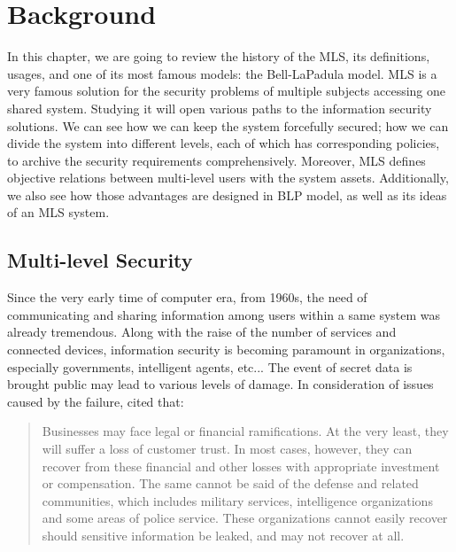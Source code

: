 
\chapter{Background} %

\label{ch:background} %


In this chapter, we are going to review the history of the MLS, its definitions, usages, and one of its most famous models: the Bell-LaPadula model.
MLS is a very famous solution for the security problems of multiple subjects accessing one shared system. 
Studying it will open various paths to the information security solutions.
We can see how we can keep the system forcefully secured; 
how we can divide the system into different levels, each of which has corresponding policies, to archive the security requirements comprehensively.
Moreover, MLS defines objective relations between multi-level users with the system assets. 
Additionally, we also see how those advantages are designed in BLP model, as well as its ideas of an MLS system.


\section{Multi-level Security}
\label{ch:background:mls}

Since the very early time of computer era, from 1960s, the need of communicating and sharing information among users within a same system was already tremendous.
Along with the raise of the number of services and connected devices, information security is becoming paramount in organizations, especially governments, intelligent agents, etc...
The event of secret data is brought public may lead to various levels of damage.
In consideration of issues caused by the failure, \citeauthor{centos:2008} \cite{centos:2008} cited that:

\begin{quote}
Businesses may face legal or financial ramifications. At the very least, they will suffer a loss of customer trust. 
In most cases, however, they can recover from these financial and other losses with appropriate investment or compensation. 
The same cannot be said of the defense and related communities, which includes military services, intelligence organizations and some areas of police service.
These organizations cannot easily recover should sensitive information be leaked, and may not recover at all. 
\end{quote}

